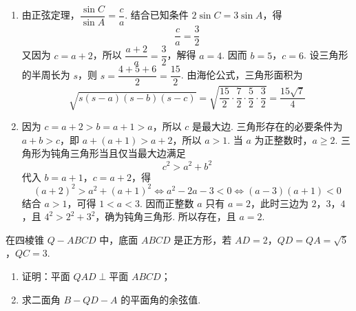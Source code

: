 \begin{solution}
\begin{enumerate}
\item 由正弦定理，\(\dfrac{\sin C}{\sin A}=\dfrac{c}{a}\). 结合已知条件 \(2\sin C=3\sin A\)，得
\[
\frac{c}{a}=\frac{3}{2}
\]
又因为 \(c=a+2\)，所以 \(\dfrac{a+2}{a}=\dfrac{3}{2}\)，解得 \(a=4\). 因而 \(b=5\)，\(c=6\). 设三角形的半周长为 \(s\)，则 \(s=\dfrac{4+5+6}{2}=\dfrac{15}{2}\). 由海伦公式，三角形面积为
\[
\sqrt{s(s-a)(s-b)(s-c)}=\sqrt{\frac{15}{2}\cdot\frac{7}{2}\cdot\frac{5}{2}\cdot\frac{3}{2}}=\frac{15\sqrt7}{4}
\]

\item 因为 \(c=a+2>b=a+1>a\)，所以 \(c\) 是最大边. 三角形存在的必要条件为 \(a+b>c\)，即 \(a+(a+1)>a+2\)，所以 \(a>1\). 当 \(a\) 为正整数时，\(a\ge2\). 三角形为钝角三角形当且仅当最大边满足
\[
c^2>a^2+b^2
\]
代入 \(b=a+1\)，\(c=a+2\)，得
\[
(a+2)^2>a^2+(a+1)^2\iff a^2-2a-3<0\iff (a-3)(a+1)<0
\]
结合 \(a>1\)，可得 \(1<a<3\). 因而正整数 \(a\) 只有 \(a=2\)，此时三边为 \(2\)，\(3\)，\(4\)，且 \(4^2>2^2+3^2\)，确为钝角三角形. 所以存在，且 \(a=2\).
\end{enumerate}
\end{solution}


\begin{problem}
在四棱锥 \(Q-ABCD\) 中，底面 \(ABCD\) 是正方形，若 \(AD=2\)，\(QD=QA=\sqrt5\)，\(QC=3\).

\begin{enumerate}
\item 证明：平面 \(QAD\perp \text{平面 }ABCD\)；
\item 求二面角 \(B-QD-A\) 的平面角的余弦值.
\end{enumerate}

\end{problem}


